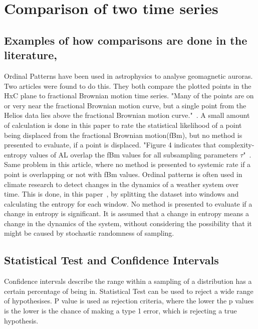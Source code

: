 \chapter{Comparison of two time series}
\section{Examples of how comparisons are done in the literature,}
Ordinal Patterns have been used in astrophysics to analyse geomagnetic auroras. Two articles were found to do this. They both compare the plotted points in the HxC plane to fractional Brownian motion time series. "Many of the points are on or very near the fractional Brownian motion curve, but a single point from the Helios data lies above the fractional Brownian motion curve."~\cite{Weygand2019}. A small amount of calculation is done in this paper to rate the statistical likelihood of a point being displaced from the fractional Brownian motion(fBm), but no method is presented to evaluate, if a point is displaced. "Figure 4 indicates that complexity-entropy values of AL overlap the fBm values for all subsampling parameters $\tau$"~\cite{Osmane2019}. Same problem in this article, where no method is presented to systemic rate if a point is overlapping or not with fBm values. Ordinal patterns is often used in climate research to detect changes in the dynamics of a weather system over time. This is done, in this paper~\cite{Saco2010}, by splitting the dataset into windows and calculating the entropy for each window. No method is presented to evaluate if a change in entropy is significant. It is assumed that a change in entropy means a change in the dynamics of the system, without considering the possibility that it might be caused by stochastic randomness of sampling. 

\section{Statistical Test and Confidence Intervals}
Confidence intervals describe the range within a sampling of a distribution has a certain percentage of being in. Statistical Test can be used to reject a wide range of hypothesises. P value is used as rejection criteria, where the lower the p values is the lower is the chance of making a type 1 error, which is rejecting a true hypothesis.\cite{Smithson2003}

